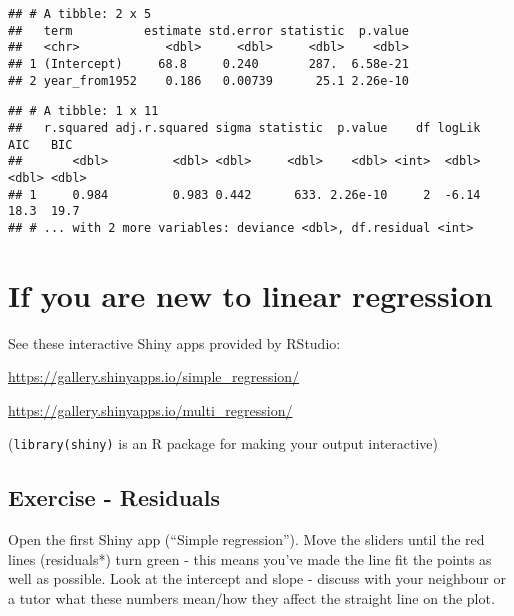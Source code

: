 \documentclass[]{book}
\makeatletter
\newenvironment{Shaded}{\begin{snugshade}}{\end{snugshade}}
\newcommand{\KeywordTok}[1]{\textcolor[rgb]{0.13,0.29,0.53}{\textbf{#1}}}
\newcommand{\StringTok}[1]{\textcolor[rgb]{0.31,0.60,0.02}{#1}}
\newcommand{\OperatorTok}[1]{\textcolor[rgb]{0.81,0.36,0.00}{\textbf{#1}}}
\newcommand{\NormalTok}[1]{#1}
\newenvironment{kframe}{%
\medskip{}
\setlength{\fboxsep}{.8em}
 \def\at@end@of@kframe{}%
 \ifinner\ifhmode%
  \def\at@end@of@kframe{\end{minipage}}%
  \begin{minipage}{\columnwidth}%
 \fi\fi%
 \def\FrameCommand##1{\hskip\@totalleftmargin \hskip-\fboxsep
 \colorbox{shadecolor}{##1}\hskip-\fboxsep
     \hskip-\linewidth \hskip-\@totalleftmargin \hskip\columnwidth}%
 \MakeFramed {\advance\hsize-\width
   \@totalleftmargin\z@ \linewidth\hsize
   \@setminipage}}%
 {\par\unskip\endMakeFramed%
 \at@end@of@kframe}
\renewenvironment{Shaded}{\begin{kframe}}{\end{kframe}}
\theoremstyle{definition}
\theoremstyle{definition}
\theoremstyle{definition}
\theoremstyle{remark}
\makeatother
\begin{document}
\begin{Shaded}
\end{Shaded}

\begin{verbatim}
## # A tibble: 2 x 5
##   term          estimate std.error statistic  p.value
##   <chr>            <dbl>     <dbl>     <dbl>    <dbl>
## 1 (Intercept)     68.8     0.240       287.  6.58e-21
## 2 year_from1952    0.186   0.00739      25.1 2.26e-10
\end{verbatim}

\begin{Shaded}
\end{Shaded}

\begin{verbatim}
## # A tibble: 1 x 11
##   r.squared adj.r.squared sigma statistic  p.value    df logLik   AIC   BIC
##       <dbl>         <dbl> <dbl>     <dbl>    <dbl> <int>  <dbl> <dbl> <dbl>
## 1     0.984         0.983 0.442      633. 2.26e-10     2  -6.14  18.3  19.7
## # ... with 2 more variables: deviance <dbl>, df.residual <int>
\end{verbatim}

\section{If you are new to linear
regression}\label{if-you-are-new-to-linear-regression}

See these interactive Shiny apps provided by RStudio:

\url{https://gallery.shinyapps.io/simple_regression/}

\url{https://gallery.shinyapps.io/multi_regression/}

(\texttt{library(shiny)} is an R package for making your output
interactive)

\subsection{Exercise - Residuals}\label{exercise---residuals}

Open the first Shiny app (``Simple regression''). Move the sliders until
the red lines (residuals*) turn green - this means you've made the line
fit the points as well as possible. Look at the intercept and slope -
discuss with your neighbour or a tutor what these numbers mean/how they
affect the straight line on the plot.
\end{document}
